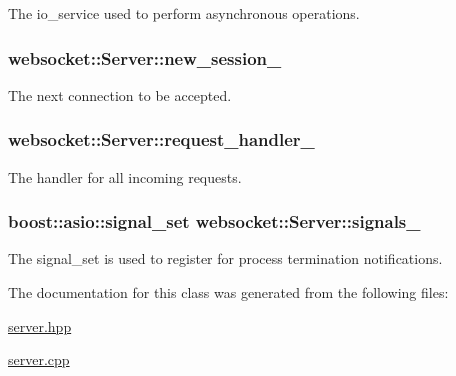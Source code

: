 The io\+\_\+service used to perform asynchronous operations. 

\subsubsection[{\texorpdfstring{new\+\_\+session\+\_\+}{new_session_}}]{ websocket\+::\+Server\+::new\+\_\+session\+\_\+\hspace{0.3cm}{\ttfamily [private]}}\hypertarget{classwebsocket_1_1Server_a86916b413a3577cb17aed4cda031691e}{}\label{classwebsocket_1_1Server_a86916b413a3577cb17aed4cda031691e}


The next connection to be accepted. 

\subsubsection[{\texorpdfstring{request\+\_\+handler\+\_\+}{request_handler_}}]{ websocket\+::\+Server\+::request\+\_\+handler\+\_\+\hspace{0.3cm}{\ttfamily [private]}}\hypertarget{classwebsocket_1_1Server_abee763cfdb56554f90a98ed4b2fc2600}{}\label{classwebsocket_1_1Server_abee763cfdb56554f90a98ed4b2fc2600}


The handler for all incoming requests. 

\subsubsection[{\texorpdfstring{signals\+\_\+}{signals_}}]{\setlength{\rightskip}{0pt plus 5cm}boost\+::asio\+::signal\+\_\+set websocket\+::\+Server\+::signals\+\_\+\hspace{0.3cm}{\ttfamily [private]}}\hypertarget{classwebsocket_1_1Server_a85a9160e9b9f070a4bf8e149623a5a6d}{}\label{classwebsocket_1_1Server_a85a9160e9b9f070a4bf8e149623a5a6d}


The signal\+\_\+set is used to register for process termination notifications. 



The documentation for this class was generated from the following files\+:\begin{DoxyCompactItemize}
\item 
\hyperlink{server_8hpp}{server.\+hpp}\item 
\hyperlink{server_8cpp}{server.\+cpp}\end{DoxyCompactItemize}
